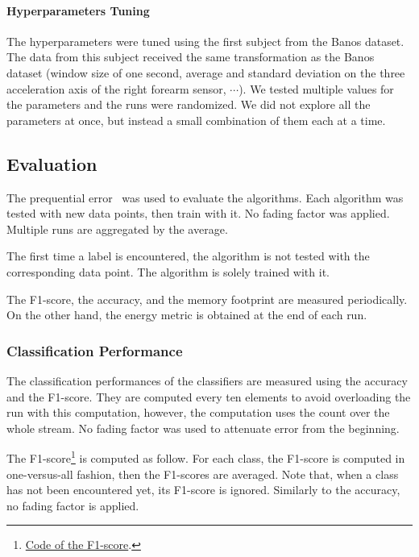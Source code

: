 \paragraph{Hyperparameters Tuning}
The hyperparameters were tuned using the first
subject from the Banos dataset.  The data from
this subject received the same transformation as
the Banos dataset (window size of one second,
average and standard deviation on the three
acceleration axis of the right forearm sensor,
$\cdots$). We tested multiple values for the
parameters and the runs were randomized.  We did
not explore all the parameters at once, but
instead a small combination of them each at a
time.

\subsection{Evaluation}
The prequential error~\cite{issues_learning_from_stream} was used to evaluate the algorithms. Each
algorithm was tested with new data points, then train with it. No fading factor
was applied. Multiple runs are aggregated by the average.

The first time a label is encountered, the algorithm is not tested with the
corresponding data point. The algorithm is solely trained with it. 

The F1-score, the accuracy, and the memory footprint are measured periodically.
On the other hand, the energy metric is obtained at the end of each run.

\subsubsection{Classification Performance}
The classification performances of the classifiers are measured using the
accuracy and the F1-score.  They are computed every ten elements to avoid
overloading the run with this computation, however, the computation uses the
count over the whole stream. No fading factor was used to attenuate error from
the beginning.

The
F1-score\footnote{\href{https://github.com/azazel7/paper-benchmark/blob/9adb1039c5a65a00a66d554f0e870d14d3fff7cb/main.cpp\#L82}{Code of the F1-score}.} is computed as follow. For each class, the F1-score is
computed in
one-versus-all fashion, then the F1-scores are averaged. Note that, when a
class has not been encountered yet, its F1-score is ignored. Similarly to the
accuracy, no fading factor is applied.

